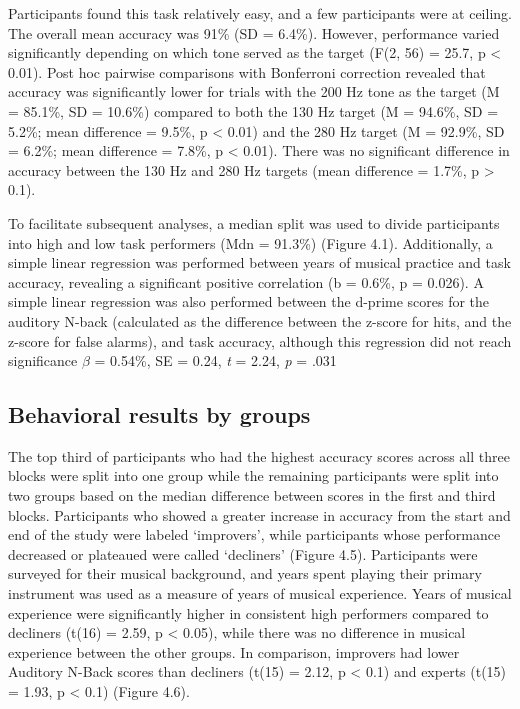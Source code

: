 Participants found this task relatively easy, and a few participants were at ceiling. The overall mean accuracy was 91\% (SD = 6.4\%). However, performance varied significantly depending on which tone served as the target (F(2, 56) = 25.7, p < 0.01). Post hoc pairwise comparisons with Bonferroni correction revealed that accuracy was significantly lower for trials with the 200 Hz tone as the target (M = 85.1\%, SD = 10.6\%) compared to both the 130 Hz target (M = 94.6\%, SD = 5.2\%; mean difference = 9.5\%, p < 0.01) and the 280 Hz target (M = 92.9\%, SD = 6.2\%; mean difference = 7.8\%, p < 0.01). There was no significant difference in accuracy between the 130 Hz and 280 Hz targets (mean difference = 1.7\%, p > 0.1). 

To facilitate subsequent analyses, a median split was used to divide participants into high and low task performers (Mdn = 91.3\%) (Figure 4.1). Additionally, a simple linear regression was performed between years of musical practice and task accuracy, revealing a significant positive correlation (b = 0.6\%, p = 0.026). A simple linear regression was also performed between the d-prime scores for the auditory N-back (calculated as the difference between the z-score for hits, and the z-score for false alarms), and task accuracy, although this regression did not reach significance $\beta$ = 0.54\%, SE  = 0.24, \textit{t} = 2.24, \textit{p} = .031











\subsection*{Behavioral results by groups}
The top third of participants who had the highest accuracy scores across all three blocks were split into one group while the remaining participants were split into two groups based on the median difference between scores in the first and third blocks. Participants who showed a greater increase in accuracy from the start and end of the study were labeled ‘improvers’, while participants whose performance decreased or plateaued were called ‘decliners’ (Figure 4.5). Participants were surveyed for their musical background, and years spent playing their primary instrument was used as a measure of years of musical experience. Years of musical experience were significantly higher in consistent high performers compared to decliners (t(16) = 2.59, p < 0.05), while there was no difference in musical experience between the other groups. In comparison, improvers had lower Auditory N-Back scores than decliners (t(15) = 2.12, p < 0.1) and experts (t(15) = 1.93, p < 0.1) (Figure 4.6).

